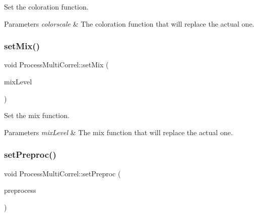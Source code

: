Set the coloration function. 


\begin{DoxyParams}{Parameters}
{\em colorscale} & The coloration function that will replace the actual one. \\
\hline
\end{DoxyParams}
\mbox{\label{class_process_multi_correl_a59a1bce24ce64616e4c3e3f625313555}} 
\subsubsection{\texorpdfstring{set\+Mix()}{setMix()}}
{\footnotesize\ttfamily void Process\+Multi\+Correl\+::set\+Mix (\begin{DoxyParamCaption}\item[{vector$<$ float $>$($\ast$)(const \mbox{\hyperlink{class_matrix}{Matrix}}$<$ float $>$ \&correl\+Matrix)}]{mix\+Level }\end{DoxyParamCaption})\hspace{0.3cm}{\ttfamily [inline]}}



Set the mix function. 


\begin{DoxyParams}{Parameters}
{\em mix\+Level} & The mix function that will replace the actual one. \\
\hline
\end{DoxyParams}
\mbox{\label{class_process_multi_correl_a60bb0450ffa0267f2a1cb74e617d06c5}} 
\subsubsection{\texorpdfstring{set\+Preproc()}{setPreproc()}}
{\footnotesize\ttfamily void Process\+Multi\+Correl\+::set\+Preproc (\begin{DoxyParamCaption}\item[{\mbox{\hyperlink{class_matrix}{Matrix}}$<$ float $>$($\ast$)(const \mbox{\hyperlink{class_matrix}{Matrix}}$<$ float $>$ \&buff)}]{preprocess }\end{DoxyParamCaption})\hspace{0.3cm}{\ttfamily [inline]}}



